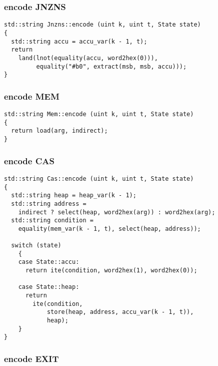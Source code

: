 \subsubsection{encode JNZNS}

\begin{lstlisting}[style=c++]
std::string Jnzns::encode (uint k, uint t, State state)
{
  std::string accu = accu_var(k - 1, t);
  return
    land(lnot(equality(accu, word2hex(0))),
         equality("#b0", extract(msb, msb, accu)));
}
\end{lstlisting}

\subsubsection{encode MEM}

\begin{lstlisting}[style=c++]
std::string Mem::encode (uint k, uint t, State state)
{
  return load(arg, indirect);
}
\end{lstlisting}

\subsubsection{encode CAS}

\begin{lstlisting}[style=c++]
std::string Cas::encode (uint k, uint t, State state)
{
  std::string heap = heap_var(k - 1);
  std::string address =
    indirect ? select(heap, word2hex(arg)) : word2hex(arg);
  std::string condition =
    equality(mem_var(k - 1, t), select(heap, address));

  switch (state)
    {
    case State::accu:
      return ite(condition, word2hex(1), word2hex(0));

    case State::heap:
      return
        ite(condition,
            store(heap, address, accu_var(k - 1, t)),
            heap);
    }
}
\end{lstlisting}

\subsubsection{encode EXIT}

